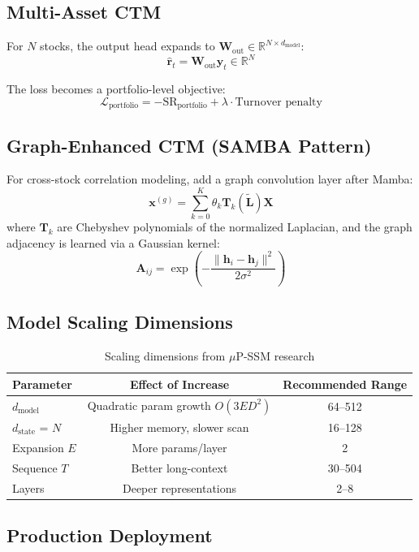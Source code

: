 \documentclass[11pt,a4paper]{article}
\newcommand{\R}{\mathbb{R}}
\newcommand{\loss}{\mathcal{L}}
\begin{document}
\subsection{Multi-Asset CTM}

For $N$ stocks, the output head expands to $\mathbf{W}_{\text{out}} \in \R^{N \times d_{\text{model}}}$:
\[
\hat{\mathbf{r}}_t = \mathbf{W}_{\text{out}} \mathbf{y}_t \in \R^N
\]

The loss becomes a portfolio-level objective:
\[
\loss_{\text{portfolio}} = -\text{SR}_{\text{portfolio}} + \lambda \cdot \text{Turnover penalty}
\]

\subsection{Graph-Enhanced CTM (SAMBA Pattern)}

For cross-stock correlation modeling, add a graph convolution layer after Mamba:
\[
\mathbf{x}^{(g)} = \sum_{k=0}^K \theta_k \mathbf{T}_k(\tilde{\mathbf{L}}) \mathbf{X}
\]
where $\mathbf{T}_k$ are Chebyshev polynomials of the normalized Laplacian,
and the graph adjacency is learned via a Gaussian kernel:
\[
\mathbf{A}_{ij} = \exp\left(-\frac{\|\mathbf{h}_i - \mathbf{h}_j\|^2}{2\sigma^2}\right)
\]

\subsection{Model Scaling Dimensions}

\begin{table}[h]
\centering
\caption{Scaling dimensions from $\mu$P-SSM research}
\label{tab:scaling}
\begin{tabular}{lcc}
\toprule
Parameter & Effect of Increase & Recommended Range \\
\midrule
$d_{\text{model}}$ & Quadratic param growth $O(3ED^2)$ & 64--512 \\
$d_{\text{state}}$ = $N$ & Higher memory, slower scan & 16--128 \\
Expansion $E$ & More params/layer & 2 \\
Sequence $T$ & Better long-context & 30--504 \\
Layers & Deeper representations & 2--8 \\
\bottomrule
\end{tabular}
\end{table}

\subsection{Production Deployment}
\end{document}
